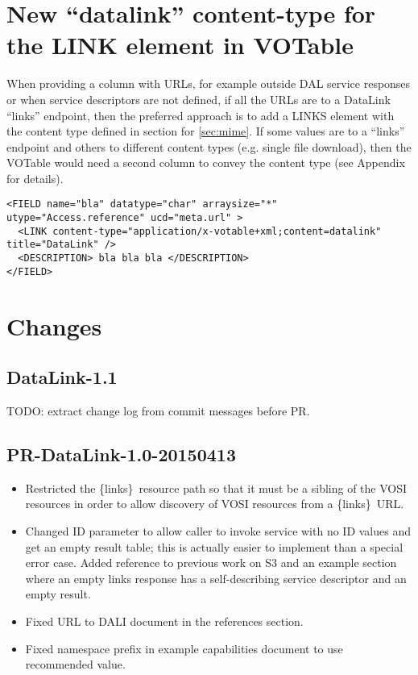 \documentclass[11pt,a4paper]{ivoa}
\newcommand{\blinks}{\{links\}}
\begin{document}
\section{New ``datalink'' content-type for the LINK element in VOTable}


When providing a column with URLs, for example outside DAL service
responses or when service descriptors  are not defined, if all the
URLs are to a DataLink ``links'' endpoint, then the preferred approach
is to add a LINKS element with the content type defined in section for
\ref{sec:mime}. If some values are to a ``links'' endpoint and others to
different content types (e.g. single file download), then the VOTable
would need a second column to convey the content type (see Appendix
for details).

\begin{verbatim} 
<FIELD name="bla" datatype="char" arraysize="*" utype="Access.reference" ucd="meta.url" > 
  <LINK content-type="application/x-votable+xml;content=datalink" title="DataLink" /> 
  <DESCRIPTION> bla bla bla </DESCRIPTION> 
</FIELD>
\end{verbatim}


\section{Changes}

\subsection{DataLink-1.1}

TODO: extract change log from commit messages before PR.

\subsection{PR-DataLink-1.0-20150413}

\begin{itemize}
\item
Restricted the \blinks\ resource path so that it must be a sibling of
the VOSI resources in order to allow discovery of VOSI resources from
a \blinks\ URL.
\item
Changed ID parameter to allow caller to invoke service with no ID values
and get an empty result table; this is actually easier to implement
than a special error case. Added reference to previous work on S3 and
an example section where an empty links response has a self-describing
service descriptor and an empty result.
\item
Fixed URL to DALI document in the references section.
\item
Fixed namespace prefix in example capabilities document to use recommended
value.
\end{itemize}
\end{document}
